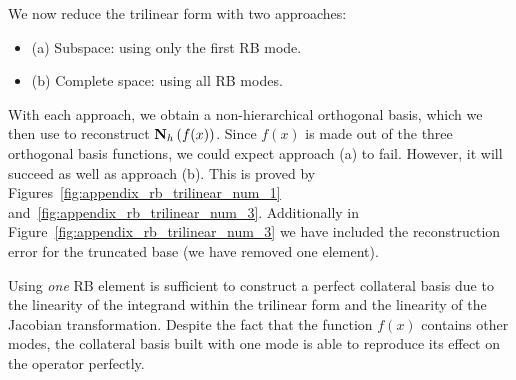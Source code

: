 \documentclass[../../thesis.tex]{subfiles}
\begin{document}
We now reduce the trilinear form with two approaches:
\begin{itemize}
    \item (a) Subspace: using only the first RB mode.
    \item (b) Complete space: using all RB modes.
\end{itemize}

With each approach, we obtain a non-hierarchical orthogonal basis,
which we then use to reconstruct $\vb{N}_h\left(f(x)\right)$.
Since $f(x)$ is made out of the three orthogonal basis functions, 
we could expect approach (a) to fail.
However, it will succeed as well as approach (b).
This is proved by Figures~\ref{fig:appendix_rb_trilinear_num_1} 
and~\ref{fig:appendix_rb_trilinear_num_3}.
Additionally in Figure~\ref{fig:appendix_rb_trilinear_num_3} we have included 
the reconstruction error for the truncated base (we have removed one element). 

Using \textit{one} RB element is sufficient to construct a perfect collateral basis
due to the linearity of the integrand within the trilinear form 
and the linearity of the Jacobian transformation.
Despite the fact that the function $f(x)$ contains other modes, 
the collateral basis built with one mode is able to reproduce its effect on the operator perfectly. 
\end{document}
